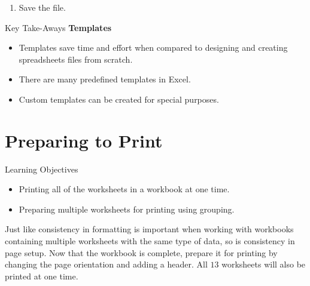\begin{enumerate}[resume]
	\item Save the file.
\end{enumerate}

\begin{center}
	\begin{tkwbox}{Key Take-Aways}
		\textbf{Templates}
		\\
		\begin{itemize}
			\setlength{\itemsep}{0pt}
			\setlength{\parskip}{0pt}
			\setlength{\parsep}{0pt}
			
			\item Templates save time and effort when compared to designing and creating spreadsheets files from scratch.
			\item There are many predefined templates in Excel.
			\item Custom templates can be created for special purposes.
			
		\end{itemize}
	\end{tkwbox}
\end{center}

\section{Preparing to Print}

\begin{center}
	\begin{objbox}{Learning Objectives}
		\begin{itemize}
			\setlength{\itemsep}{0pt}
			\setlength{\parskip}{0pt}
			\setlength{\parsep}{0pt}
			
			\item Printing all of the worksheets in a workbook at one time.
			\item Preparing multiple worksheets for printing using grouping.
			
		\end{itemize}
	\end{objbox}
\end{center}

Just like consistency in formatting is important when working with workbooks containing multiple worksheets with the same type of data, so is consistency in page setup. Now that the  workbook is complete, prepare it for printing by changing the page orientation and adding a header. All $ 13 $ worksheets will also be printed at one time.

